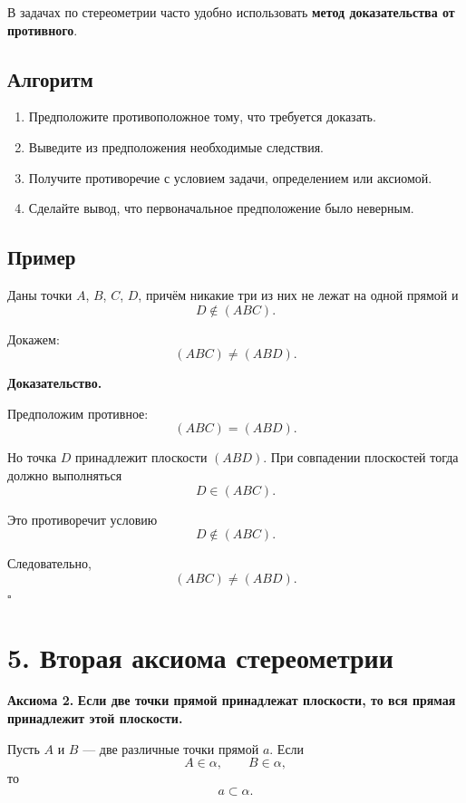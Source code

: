 \documentclass[a4paper,12pt]{article}
\newcommand{\term}[1]{\textcolor{darkaccent}{\textbf{#1}}}
\newcommand{\important}[1]{\textbf{\textcolor{darkaccent}{#1}}}
\newcommand{\plane}[1]{(#1)}
\newcommand{\Axiom}[1]{\textcolor{darkaccent}{\textbf{Аксиома #1.}}}
\newcommand{\solutionmark}{\hfill$\square$}
\begin{document}
В задачах по стереометрии часто удобно использовать \term{метод доказательства от противного}.

\subsection*{\textcolor{accent}{Алгоритм}}

\begin{enumerate}
  \item Предположите противоположное тому, что требуется доказать.
  \item Выведите из предположения необходимые следствия.
  \item Получите противоречие с условием задачи, определением или аксиомой.
  \item Сделайте вывод, что первоначальное предположение было неверным.
\end{enumerate}

\subsection*{\textcolor{accent}{Пример}}

Даны точки $A$, $B$, $C$, $D$, причём никакие три из них не лежат на одной прямой и
\[
D\notin\plane{ABC}.
\]

Докажем:
\[
\plane{ABC}\ne\plane{ABD}.
\]

\textbf{Доказательство.}

Предположим противное:
\[
\plane{ABC}=\plane{ABD}.
\]

Но точка $D$ принадлежит плоскости $\plane{ABD}$. При совпадении плоскостей тогда должно выполняться
\[
D\in\plane{ABC}.
\]

Это противоречит условию
\[
D\notin\plane{ABC}.
\]

Следовательно,
\[
\boxed{\plane{ABC}\ne\plane{ABD}}.
\]
\solutionmark


\section*{\textcolor{darkaccent}{5. Вторая аксиома стереометрии}}

\Axiom{2}
\important{Если две точки прямой принадлежат плоскости, то вся прямая принадлежит этой плоскости.}

Пусть $A$ и $B$ --- две различные точки прямой $a$. Если
\[
A\in\alpha,
\qquad
B\in\alpha,
\]
то
\[
\boxed{a\subset\alpha}.
\]
\end{document}
